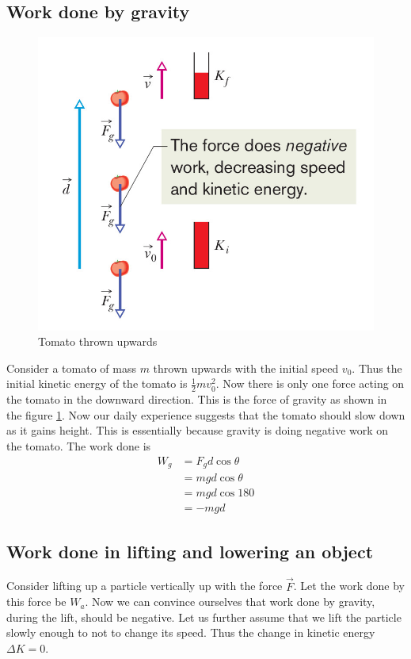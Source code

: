 \documentclass[10pt]{article}
\begin{document}
\subsection{Work done by gravity}
\begin{figure}[h]
\includegraphics[scale=.9]{gravwork}
\centering
\caption{Tomato thrown upwards}
\label{workdgrav}
\end{figure}
Consider a tomato of mass $m$ thrown upwards with the initial speed $v_0$.  Thus the initial kinetic energy of the tomato is $\frac{1}{2}mv_0^2$.  Now there is only one force acting on the tomato in the downward direction.  This is the force of gravity as shown in the figure \ref{workdgrav}.  Now our daily experience suggests that the tomato should slow down as it gains height.  This is essentially because gravity is doing negative work on the tomato.  The work done is
\begin{equation}
  \begin{split}
    W_g&=F_gd\cos\theta\\
       &= mgd\cos\theta\\
       &= mgd\cos 180\\
       &= -mgd
  \end{split}
\end{equation}

\subsection{Work done in lifting and lowering an object}
Consider lifting up a particle vertically up with the force $\vec{F}$.  Let the work done by this force be $W_a$.  Now we can convince ourselves that work done by gravity, during the lift, should be negative.  Let us further assume that we lift the particle slowly enough to not to change its speed.  Thus the change in kinetic energy $\Delta K=0$.
\end{document}
